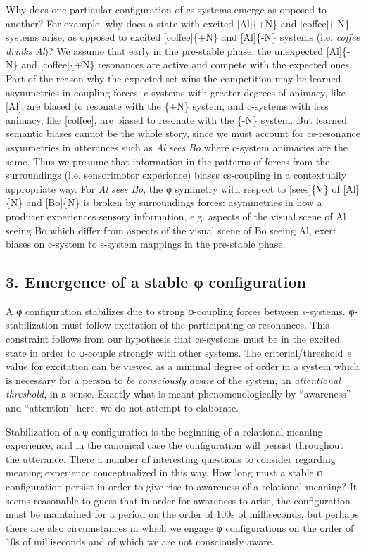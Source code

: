   Why does one particular configuration of cs-systems emerge as opposed to another? For example, why does a state with excited [Al]\{+N\} and [coffee]\{-N\} systems arise, as opposed to excited [coffee]\{+N\} and [Al]\{-N\} systems (i.e. \textit{coffee} \textit{drinks} \textit{Al})? We assume that early in the pre-stable phase, the unexpected [Al]\{-N\} and [coffee]\{+N\} resonances are active and compete with the expected ones. Part of the reason why the expected set wins the competition may be learned asymmetries in coupling forces: c-systems with greater degrees of animacy, like [Al], are biased to resonate with the \{+N\} system, and c-systems with less animacy, like [coffee], are biased to resonate with the \{-N\} system. But learned semantic biases cannot be the whole story, since we must account for cs-resonance asymmetries in utterances such as \textit{Al} \textit{sees} \textit{Bo} where c-system animacies are the same. Thus we presume that information in the patterns of forces from the surroundings (i.e. sensorimotor experience) biases cs-coupling in a contextually appropriate way. For \textit{Al} \textit{sees} \textit{Bo}, the φ symmetry with respect to [sees]\{V\} of [Al]\{N\} and [Bo]\{N\} is broken by surroundings forces: asymmetries in how a producer experiences sensory information, e.g. aspects of the visual scene of Al seeing Bo which differ from aspects of the visual scene of Bo seeing Al, exert biases on c-system to s-system mappings in the pre-stable phase.

\subsection{3. Emergence of a stable φ configuration}

A φ configuration stabilizes due to strong φ{}-coupling forces between s-systems. φ{}-stabilization must follow excitation of the participating cs-resonances. This constraint follows from our hypothesis that cs-systems must be in the excited state in order to φ-couple strongly with other systems. The criterial/threshold \textit{e} value for excitation can be viewed as a minimal degree of order in a system which is necessary for a person to \textit{be} \textit{consciously} \textit{aware} of the system, an \textit{attentional} \textit{threshold}, in a sense. Exactly what is meant phenomenologically by “awareness” and “attention” here, we do not attempt to elaborate. 

   Stabilization of a φ configuration is the beginning of a relational meaning experience, and in the canonical case the configuration will persist throughout the utterance. There a number of interesting questions to consider regarding meaning experience conceptualized in this way. How long must a stable φ configuration persist in order to give rise to awareness of a relational meaning? It seems reasonable to guess that in order for awareness to arise, the configuration must be maintained for a period on the order of 100s of milliseconds, but perhaps there are also circumstances in which we engage φ configurations on the order of 10s of milliseconds and of which we are not consciously aware.

